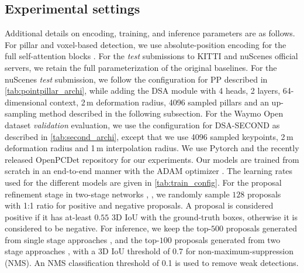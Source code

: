 \documentclass[10pt,twocolumn,letterpaper]{article}
\begin{document}
\subsection{Experimental settings}
Additional details on encoding, training, and inference parameters are as follows. For pillar and voxel-based detection, we use absolute-position encoding for the full self-attention blocks \cite{SA}. For the \textit{test} submissions to KITTI and nuScenes official servers, we retain the full parameterization of the original baselines. For the nuScenes \textit{test} submission, we follow the configuration for PP described in \cref{tab:pointpillar_archi}, while adding the DSA module with 4 heads, 2 layers, 64-dimensional context, 2\,m deformation radius, 4096 sampled pillars and an up-sampling method described in the following subsection. For the Waymo Open dataset \textit{validation} evaluation, we use the configuration for DSA-SECOND as described in \cref{tab:second_archi}, except that we use 4096 sampled keypoints, 2\,m deformation radius and 1\,m interpolation radius. We use Pytorch \cite{Pytorch} and the recently released OpenPCDet \cite{OpenPCDet} repository for our experiments. Our models are trained from scratch in an end-to-end manner with the ADAM optimizer \cite{Adam}. The learning rates used for the different models are given in \cref{tab:train_config}. For the proposal refinement stage in two-stage networks \cite{PointRCNN}, \cite{PVRCNN}, we randomly sample $128$ proposals with 1:1 ratio for positive and negative proposals. A proposal is considered positive if it has at-least $0.55$ 3D IoU with the ground-truth boxes, otherwise it is considered to be negative. For inference, we keep the top-$500$ proposals generated from  single stage approaches \cite{pointpillars}, \cite{SECOND} and the top-$100$ proposals generated from two stage approaches \cite{PointRCNN}, \cite{PVRCNN} with a 3D IoU threshold of 0.7 for non-maximum-suppression (NMS). An NMS classification threshold of 0.1 is used to remove weak detections.
\end{document}
